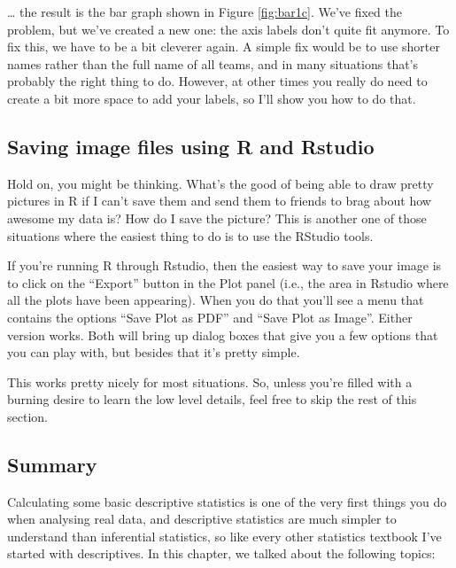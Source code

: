 \documentclass[
]{book}
\begin{document}
\ldots{} the result is the bar graph shown in Figure \ref{fig:bar1c}. We've fixed the problem, but we've created a new one: the axis labels don't quite fit anymore. To fix this, we have to be a bit cleverer again. A simple fix would be to use shorter names rather than the full name of all teams, and in many situations that's probably the right thing to do. However, at other times you really do need to create a bit more space to add your labels, so I'll show you how to do that.

\hypertarget{saveimage}{%
\subsection{Saving image files using R and Rstudio}\label{saveimage}}

Hold on, you might be thinking. What's the good of being able to draw pretty pictures in R if I can't save them and send them to friends to brag about how awesome my data is? How do I save the picture? This is another one of those situations where the easiest thing to do is to use the RStudio tools.

If you're running R through Rstudio, then the easiest way to save your image is to click on the ``Export'' button in the Plot panel (i.e., the area in Rstudio where all the plots have been appearing). When you do that you'll see a menu that contains the options ``Save Plot as PDF'' and ``Save Plot as Image''. Either version works. Both will bring up dialog boxes that give you a few options that you can play with, but besides that it's pretty simple.

This works pretty nicely for most situations. So, unless you're filled with a burning desire to learn the low level details, feel free to skip the rest of this section.

\hypertarget{summary-2}{%
\subsection{Summary}\label{summary-2}}

Calculating some basic descriptive statistics is one of the very first things you do when analysing real data, and descriptive statistics are much simpler to understand than inferential statistics, so like every other statistics textbook I've started with descriptives. In this chapter, we talked about the following topics:
\end{document}
